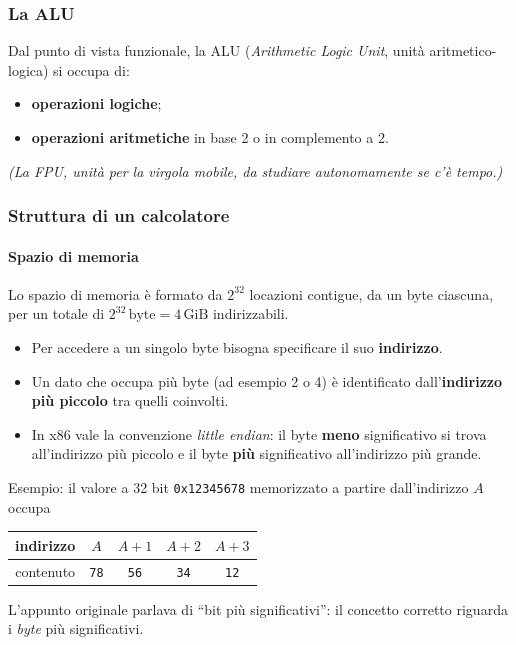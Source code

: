 \documentclass[11pt,a4paper]{article}
\begin{document}
	\subsubsection*{La ALU}
	
	Dal punto di vista funzionale, la ALU (\emph{Arithmetic Logic Unit}, unità aritmetico-logica) si occupa di:
	\begin{itemize}[leftmargin=*]
		\item \textbf{operazioni logiche};
		\item \textbf{operazioni aritmetiche} in base 2 o in complemento a 2.
	\end{itemize}
	
	\emph{(La FPU, unità per la virgola mobile, da studiare autonomamente se c'è tempo.)}
	
	\subsubsection*{Struttura di un calcolatore}
	
	\paragraph*{Spazio di memoria}
	
	Lo spazio di memoria è formato da $2^{32}$ locazioni contigue, da un byte ciascuna, per un totale di $2^{32}\,\text{byte} = 4\,\text{GiB}$ indirizzabili.
	
	\begin{itemize}[leftmargin=*]
		\item Per accedere a un singolo byte bisogna specificare il suo \textbf{indirizzo}.
		\item Un dato che occupa più byte (ad esempio 2 o 4) è identificato dall'\textbf{indirizzo più piccolo} tra quelli coinvolti.
		\item In x86 vale la convenzione \emph{little endian}: il byte \textbf{meno} significativo si trova all'indirizzo più piccolo e il byte \textbf{più} significativo all'indirizzo più grande.
	\end{itemize}
	
	\begin{integrazione}
		Esempio: il valore a 32 bit \texttt{0x12345678} memorizzato a partire dall'indirizzo $A$ occupa
		\begin{center}
			\begin{tabular}{c|cccc}
				indirizzo & $A$ & $A+1$ & $A+2$ & $A+3$ \\ \hline
				contenuto & \texttt{78} & \texttt{56} & \texttt{34} & \texttt{12}
			\end{tabular}
		\end{center}
		L'appunto originale parlava di ``bit più significativi'': il concetto corretto riguarda i \emph{byte} più significativi.
	\end{integrazione}
	
\end{document}

